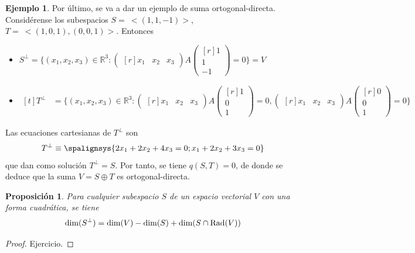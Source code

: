\documentclass[12pt]{report}
\newtheorem{proposition}{Proposición}[chapter]
\theoremstyle{definition}
\theoremstyle{definition}
\newtheorem{example}{Ejemplo}[chapter]
\theoremstyle{remark}
\newcommand{\R}{\mathbb R}
\begin{document}
\begin{example}
\vspace{2mm}
\noindent Por último, se va a dar un ejemplo de suma ortogonal-directa. Considérense los subespacios $S = \ <(1,1,-1)>$, $T = \ <(1,0,1),(0,0,1)>$. Entonces
\begin{itemize}
    \item $ S^\perp = \{(x_1,x_2,x_3) \in \R^3 \colon \begin{pmatrix*}[r]
    x_1 & x_2 & x_3
\end{pmatrix*} A \begin{pmatrix*}[r]
    1 \\
    1 \\
    -1
\end{pmatrix*} = 0\} = V$
    \item $\begin{aligned}[t] T^\perp &= \{(x_1,x_2,x_3) \in \R^3 \colon \begin{pmatrix*}[r]
    x_1 & x_2 & x_3
\end{pmatrix*}A\begin{pmatrix*}[r]
    1 \\
    0 \\
    1
\end{pmatrix*} = 0, \begin{pmatrix*}[r]
    x_1 & x_2 & x_3
\end{pmatrix*}A\begin{pmatrix*}[r]
    0 \\
    0 \\
    1
\end{pmatrix*} = 0\}
    \end{aligned}$
\end{itemize}
Las ecuaciones cartesianas de $T^\perp$ son
\[
T^\perp \equiv \spalignsys{
    2x_1+2x_2+4x_3=0 ;
    x_1+2x_2+3x_3=0
}
\]
que dan como solución $T^\perp = S$. Por tanto, se tiene $q(S,T) = 0$, de donde se deduce que la suma $V = S \oplus T$ es ortogonal-directa.
\end{example}

\begin{proposition}
\label{prop4.1.}
Para cualquier subespacio $S$ de un espacio vectorial $V$ con una forma cuadrática, se tiene
\[\textup{dim}(S^\perp) = \textup{dim}(V) - \textup{dim}(S) + \textup{dim}(S \cap \textup{Rad}(V))\]
\end{proposition}

\begin{proof}
Ejercicio.
\end{proof}
\end{document}
